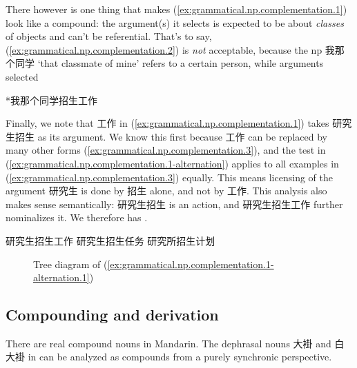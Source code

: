 \documentclass[UTF8, a4paper, oneside, scheme=plain, 12pt]{ctexrep}
\newcommand{\translate}[1]{`#1'}
\begin{document}
There however is one thing that makes (\ref{ex:grammatical.np.complementation.1})
look like a compound:
the argument(s) it selects is expected to be about \emph{classes} of objects and can't be referential.
That's to say, (\ref{ex:grammatical.np.complementation.2})
is \emph{not} acceptable, because the \ac{np} 我那个同学 \translate{that classmate of mine}
refers to a certain person, while arguments selected 

\begin{exe}
    \ex\label{ex:grammatical.np.complementation.2} *我那个同学招生工作
\end{exe}

Finally, we note that 工作 in (\ref{ex:grammatical.np.complementation.1}) takes 研究生招生 as its argument.
We know this first because 工作 can be replaced by many other forms 
(\ref{ex:grammatical.np.complementation.3}),
and the test in (\ref{ex:grammatical.np.complementation.1-alternation})
applies to all examples in (\ref{ex:grammatical.np.complementation.3}) equally.
This means licensing of the argument 研究生 is done by 招生 alone,
and not by 工作.
This analysis also makes sense semantically:
研究生招生 is an action, and 研究生招生工作 further nominalizes it.
We therefore has .

\begin{exe}
    \ex\label{ex:grammatical.np.complementation.3} \begin{xlist}
        \ex 研究生招生工作
        \ex 研究生招生任务
        \ex 研究所招生计划
    \end{xlist}
\end{exe}

\begin{figure}[H]
    \centering
    {
        \small
        
    }
    \caption{Tree diagram of (\ref{ex:grammatical.np.complementation.1-alternation.1})}
    \label{fig:grammatical.np.complementation.1-alternation.1}
\end{figure}

\subsection{Compounding and derivation}\label{sec:grammatical.np.derivation}

There are real compound nouns in Mandarin.
The dephrasal nouns 大褂 and 白大褂 in 
can be analyzed as compounds from a purely synchronic perspective.
\end{document}
